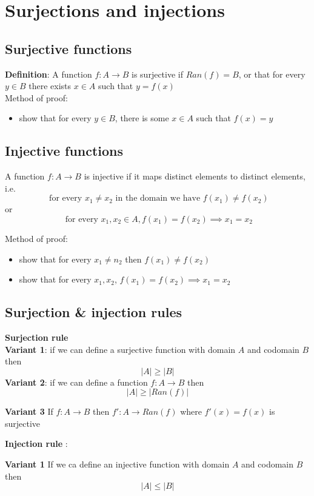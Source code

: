 \section{Surjections and injections}

\subsection{Surjective functions}

\begin{framed}
   \textbf{Definition}: A function $f: A \rightarrow B$ is surjective if $Ran(f) = B$, or that for every  $y \in B$ there exists $x \in A$ such that $y = f(x) $ \\


   Method of proof: 
   \begin{itemize}
      \item show that for every $y \in B$, there is some $x \in A$ such that $f(x) = y$
   \end{itemize}
\end{framed}

\subsection{Injective functions}

\begin{framed}
   A function $f: A \rightarrow B$ is injective if it maps distinct elements to distinct elements, i.e. 
   \[
     \text{ for every } x_1 \neq x_2 \text{ in the domain we have } f(x_1) \neq f(x_2)
   \]  or
   \[
     \text{ for every }x_1, x_2 \in A, f(x_1) = f(x_2) \implies x_1 = x_2
   \] 

   Method of proof: 
   \begin{itemize}
      \item show that for every $x_1 \neq n_2$ then $f(x_1) \neq f(x_2)$
      \item show that for every $x_1, x_2$, $f(x_1) = f(x_2) \implies x_1 = x_2$
   \end{itemize}
\end{framed}

\subsection{Surjection \& injection rules}

\begin{framed}
   \textbf{Surjection rule} \\

   \textbf{Variant 1}: if we can define a surjective function with domain $A$ and codomain $B$ then
   \[
     |A| \geq |B|
   \] 
   \textbf{Variant 2}: if we can define a function $f: A \rightarrow B$ then 
   \[
     |A| \geq |Ran(f)|
   \] 

   \textbf{Variant 3} If $f: A \rightarrow B$ then $f' : A \rightarrow Ran(f) $ where $f'(x) = f(x) $ is surjective
\end{framed}

\begin{framed}
   \textbf{Injection rule} :

   \textbf{Variant 1} If we ca define an injective function with domain $A$ and codomain $B$ then
   \[
     |A| \leq |B|
   \] 
\end{framed}



